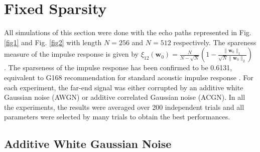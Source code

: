 
\vspace{-0.3cm}
\section{Fixed Sparsity}\label{sec:5.2}
\vspace{-0.5cm}
\noindent All simulations of this section were done with the echo paths represented in Fig. \ref{fig1} and Fig. \ref{fig2} with length $N=256$ and $N=512$ respectively. The spareness measure of the impulse response is given by $\xi_{12}(\textbf{w}_0)=\frac{N}{N-\sqrt{N}}\left(1-\frac{\|\textbf{w}_0\|_1}{\sqrt{N}\|\textbf{w}_0\|_2}\right)$ \cite{Duttweiler}. The sparseness of the impulse response has been confirmed to be 0.6131, equivalent to G168 recommendation for standard acoustic impulse response  \cite{Morgan}. For each experiment, the far-end signal was either corrupted by an additive white Gaussian noise (AWGN) or additive correlated Gaussian noise (ACGN). In all the experiments, the results were averaged over 200 independent trials and all parameters were selected by many trials to obtain the best performances.

\vspace{-0.3cm}
\subsection{Additive White Gaussian Noise}\label{sec:5.2.1}

\vspace{-0.5cm}
